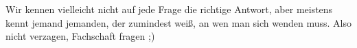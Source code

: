 Wir kennen vielleicht nicht auf jede Frage die richtige Antwort, aber meistens kennt jemand jemanden, der zumindest weiß, an wen man sich wenden muss. Also nicht verzagen, Fachschaft fragen ;)